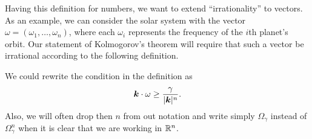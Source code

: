 \documentclass[twoside,letterpaper,10pt]{article}
\numberwithin{equation}{section}
\begin{document}
Having this definition for numbers, we want to extend ``irrationality'' to
vectors.
As an example, we can consider the solar system with the vector $\omega =
(\omega_1, \ldots, \omega_n)$, where each $\omega_i$ represents the frequency of
the $i$th planet's orbit.
Our statement of Kolmogorov's theorem will require that such a vector be
irrational according to the following definition.
\begin{defn}
  \label{def:diovec}
  \diovector{}
\end{defn}
We could rewrite the condition in the definition as
\begin{equation}
  \label{eq:diovec}
  \bm{k} \cdot \omega \geq \frac{\gamma}{|\bm{k}|^n}.
\end{equation}
Also, we will often drop then $n$ from out notation and write simply
$\Omega_{\gamma}$ instead of $\Omega_{\gamma}^n$ when it is clear that we are
working in $\mathbb{R}^n$.
\end{document}
